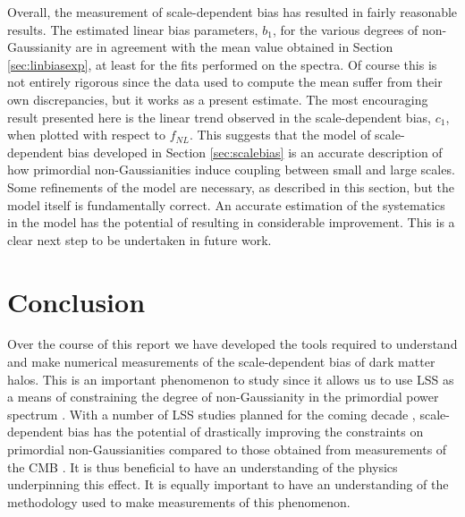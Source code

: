 \documentclass[10pt,letterpaper,final]{iopart}
\numberwithin{equation}{subsection}
\begin{document}
Overall, the measurement of scale-dependent bias has resulted in fairly reasonable results. The estimated linear bias parameters, $b_1$, for the various degrees of non-Gaussianity are in agreement with the mean value obtained in Section \ref{sec:linbiasexp}, at least for the fits performed on the spectra. Of course this is not entirely rigorous since the data used to compute the mean suffer from their own discrepancies, but it works as a present estimate. The most encouraging result presented here is the linear trend observed in the scale-dependent bias, $c_1$, when plotted with respect to $f_{NL}$. This suggests that the model of scale-dependent bias developed in Section \ref{sec:scalebias} is an accurate description of how primordial non-Gaussianities induce coupling between small and large scales. Some refinements of the model are necessary, as described in this section, but the model itself is fundamentally correct. An accurate estimation of the systematics in the model has the potential of resulting in considerable improvement. This is a clear next step to be undertaken in future work.  




\section{Conclusion}

Over the course of this report we have developed the tools required to understand and make numerical measurements of the scale-dependent bias of dark matter halos. This is an important phenomenon to study since it allows us to use LSS as a means of constraining the degree of non-Gaussianity in the primordial power spectrum \cite{Dalal}. With a number of LSS studies planned for the coming decade \cite{LSSSurveys}\cite{DES}\cite{LSST}\cite{DESI}\cite{Euclid}, scale-dependent bias has the potential of drastically improving the constraints on primordial non-Gaussianities compared to those obtained from measurements of the CMB \cite{LSSSurveys}. It is thus beneficial to have an understanding of the physics underpinning this effect. It is equally important to have an understanding of the methodology used to make measurements of this phenomenon. 
\end{document}

